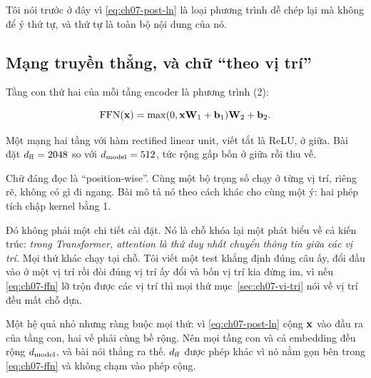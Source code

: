 Tôi nói trước ở đây vì \eqref{eq:ch07-post-ln} là loại phương trình dễ chép lại
mà không để ý thứ tự, và thứ tự là toàn bộ nội dung của nó.

\subsection*{Mạng truyền thẳng, và chữ \enquote{theo vị trí}}

%
Tầng con thứ hai của mỗi tầng encoder là phương trình (2):

\begin{equation}
  \operatorname{FFN}(\mathbf{x}) = \max(0, \mathbf{x}\mathbf{W}_1 + \mathbf{b}_1)\mathbf{W}_2 + \mathbf{b}_2.
  \label{eq:ch07-ffn}
\end{equation}

Một mạng hai tầng với hàm rectified linear unit, viết tắt là ReLU, ở giữa. Bài
đặt \(d_{\mathrm{ff}} = 2048\) so với
\(d_{\mathrm{model}} = 512\), tức rộng gấp bốn ở giữa rồi thu về.

Chữ đáng đọc là \enquote{position-wise}. Cùng một bộ trọng số chạy ở từng vị
trí, riêng rẽ, không có gì đi ngang. Bài mô tả nó theo cách khác cho cùng một
ý: hai phép tích chập kernel bằng 1.

Đó không phải một chi tiết cài đặt. Nó là chỗ khóa lại một phát biểu về cả kiến
trúc: \emph{trong Transformer, attention là thứ duy nhất chuyển thông tin giữa
các vị trí.} Mọi thứ khác chạy tại chỗ. Tôi viết một test khẳng định đúng câu
ấy, đổi đầu vào ở một vị trí rồi đòi đúng vị trí ấy đổi và bốn vị trí kia đứng
im, vì nếu \eqref{eq:ch07-ffn} lỡ trộn được các vị trí thì mọi thứ
mục~\ref{sec:ch07-vi-tri} nói về vị trí đều mất chỗ dựa.

%
Một hệ quả nhỏ nhưng ràng buộc mọi thứ: vì \eqref{eq:ch07-post-ln} cộng
\(\mathbf{x}\) vào đầu ra của tầng con, hai vế phải cùng bề rộng. Nên mọi tầng
con và cả embedding đều rộng \(d_{\mathrm{model}}\), và bài nói thẳng ra thế. \(d_{\mathrm{ff}}\)
được phép khác vì nó nằm gọn bên trong \eqref{eq:ch07-ffn} và không chạm vào
phép cộng.
